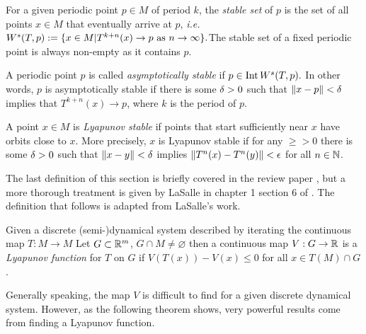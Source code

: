 \begin{defn}
	For a given periodic point \( p\in M \) of period \( k \), the \textit{stable set} of \( p \) is the set of all points \( x\in M \) that eventually arrive at \( p \), \textit{i.e.} \( W^s(T,p)\mathrel{\mathop{:}}= \{x\in M| T^{k+n}(x)\rightarrow p \text{ as } n\rightarrow\infty\}. \)The stable set of a fixed periodic point is always non-empty as it contains \( p \).
\end{defn}  
\begin{defn}
	A periodic point \( p \) is called \textit{asymptotically stable} if \( p\in\operatorname{Int}W^s(T,p). \)  In other words, \( p \) is asymptotically stable if there is some \( \delta>0 \) such that \( \norm{x-p}<\delta \) implies that \( T^{k+n}(x)\rightarrow p \), where \( k \) is the period of \( p \).  
\end{defn}

\begin{defn}
	A point \( x\in M \) is \textit{Lyapunov stable} if points that start sufficiently near \( x \) have orbits close to \( x \). More precisely, \( x \) is Lyapunov stable if for any \( \ge>0\) there is some \(\delta>0\)  such that \( \norm{x-y}<\delta \) implies \( \norm{T^n(x)-T^n(y)}<\epsilon\) for all \(n\in\mathbb N \).
\end{defn}

The last definition of this section is briefly covered in the review paper \cite{mei2017lasalle}, but a more thorough treatment is given by LaSalle in chapter 1 section 6 of \cite{lasalle1976dynsys}. The definition that follows is adapted from LaSalle's work.

\begin{defn}
	Given a discrete (semi-)dynamical system described by iterating the continuous map \( T:M \rightarrow M\) Let \( G\subset\mathbb R^m\), \( G\cap M\neq \varnothing\) then a continuous map \( V:G\rightarrow\mathbb R \) is a \textit{Lyapunov function} for \( T \) on \( G \) if \( V(T(x))-V(x)\leq 0 \) for all \( x\in T(M)\cap G \).
\end{defn}

Generally speaking, the map \( V \) is difficult to find for a given discrete dynamical system.  However, as the following theorem shows, very powerful results come from finding a Lyapunov function.

